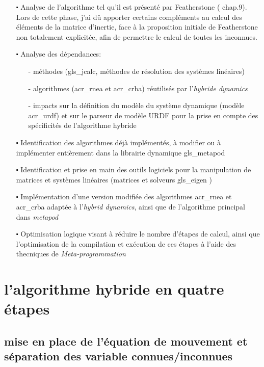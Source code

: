 \documentclass{report}
\begin{document}
\begin{itemize}
  \item[$\centerdot$] Analyse de l'algorithme tel qu'il est présenté par Featherstone (\cite{bib_featherstone} chap.9). Lors de cette phase, j'ai dû apporter certains compléments au calcul des éléments de la matrice d'inertie, face à la proposition initiale de Featherstone non totalement explicitée, afin de permettre le calcul de toutes les inconnues.
  \item[$\centerdot$] Analyse des dépendances:
  \begin{itemize}
    \item[-] méthodes (\gls{gls_jcalc}, méthodes de résolution des systèmes linéaires)
    \item[-] algorithmes (\gls{acr_rnea} et \gls{acr_crba}) réutilisés par l'\emph{hybride dynamics}
    \item[-] impacts sur la définition du modèle du système dynamique (modèle \gls{acr_urdf}) et sur le parseur de modèle URDF pour la prise en compte des spécificités de l'algorithme hybride
  \end{itemize}
  \item[$\centerdot$] Identification des algorithmes déjà implémentés, à modifier ou à implémenter entièrement dans la librairie dynamique \gls{gls_metapod}
  \item[$\centerdot$] Identification et prise en main des outils logiciels pour la manipulation de matrices et systèmes linéaires (matrices et solveurs \gls{gls_eigen} \cite{bib_eigen})
  \item[$\centerdot$] Implémentation d'une version modifiée des algorithmes \gls{acr_rnea} et \gls{acr_crba} adaptée à l'\emph{hybrid dynamics}, ainsi que de l'algorithme principal dans \emph{metapod}
  \item[$\centerdot$] Optimisation logique visant à réduire le nombre d'étapes de calcul, ainsi que l'optimisation de la compilation et exécution de ces étapes à l'aide des thecniques de \emph{Meta-programmation}
\end{itemize}


\section{l'algorithme hybride en quatre étapes}

\subsection{mise en place de l'équation de mouvement et séparation des variable connues/inconnues}
\end{document}
